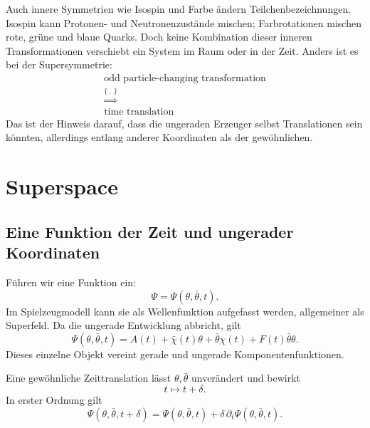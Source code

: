 Auch innere Symmetrien wie Isospin und Farbe ändern Teilchenbezeichnungen. Isospin kann Protonen- und Neutronenzustände mischen; Farbrotationen mischen rote, grüne und blaue Quarks. Doch keine Kombination dieser inneren Transformationen verschiebt ein System im Raum oder in der Zeit. Anders ist es bei der Supersymmetrie:
\begin{equation}
\begin{gathered}
\text{odd particle-changing transformation}\\
\mathrel{\stackrel{\{\ ,\ \}}{\Longrightarrow}}\\
\text{time translation}
\end{gathered}
\end{equation}
Das ist der Hinweis darauf, dass die ungeraden Erzeuger selbst Translationen sein könnten, allerdings entlang anderer Koordinaten als der gewöhnlichen.

\section{Superspace}

\subsection{Eine Funktion der Zeit und ungerader Koordinaten}

Führen wir eine Funktion ein:
\begin{equation}
\Psi=\Psi(\theta,\bar\theta,t).
\end{equation}
Im Spielzeugmodell kann sie als Wellenfunktion aufgefasst werden, allgemeiner als Superfeld. Da die ungerade Entwicklung abbricht, gilt
\begin{equation}
\Psi(\theta,\bar\theta,t)
=A(t)+\bar\chi(t)\theta
+\bar\theta\chi(t)+F(t)\bar\theta\theta.
\end{equation}
Dieses einzelne Objekt vereint gerade und ungerade Komponentenfunktionen. 

Eine gewöhnliche Zeittranslation lässt \(\theta,\bar\theta\) unverändert und bewirkt
\begin{equation}
t\longmapsto t+\delta.
\end{equation}
In erster Ordnung gilt
\begin{equation}
\Psi(\theta,\bar\theta,t+\delta)
=\Psi(\theta,\bar\theta,t)
+\delta\,\partial_t\Psi(\theta,\bar\theta,t).
\end{equation}

